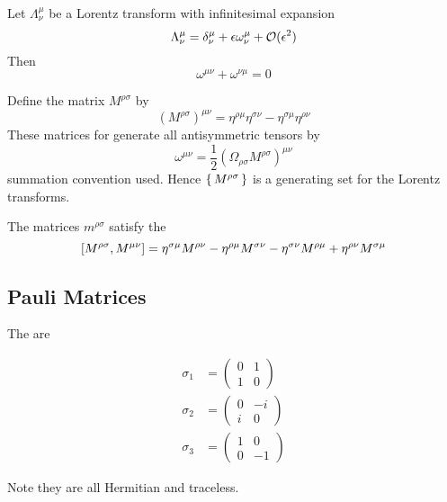 \documentclass{article}
\begin{document}
\begin{theorem}
Let $\Lambda^\mu_\nu$ be a Lorentz transform with infinitesimal expansion 
\[
\Lambda^\mu_\nu=\delta^\mu_\nu+\eps \omega^\mu_\nu +\mathcal{O}(\eps^2) 
\]
Then 
\[
\omega^{\mu\nu}+\omega^{\nu\mu}=0
\]
\end{theorem}

\begin{definition}
Define the matrix $M^{\rho\sigma}$ by 
\[
\left( M^{\rho\sigma} \right)^{\mu\nu} = \eta^{\rho\mu}\eta^{\sigma\nu}-\eta^{\sigma\mu}\eta^{\rho\nu}
\]
These matrices for generate all antisymmetric tensors by \[
\omega^{\mu\nu}=\frac{1}{2}\left(\Omega_{\rho\sigma}M^{\rho\sigma}\right)^{\mu\nu}
\]
summation convention used. Hence $\set{M^{\rho\sigma}}$ is a generating set for the Lorentz transforms. 
\end{definition}

\begin{definition}
The matrices $m^{\rho\sigma}$ satisfy the 
\[
\comm[M^{\rho\sigma}]{M^{\mu\nu}}=\eta^{\sigma\mu}M^{\rho\nu}-\eta^{\rho\mu}M^{\sigma\nu}-\eta^{\sigma\nu}M^{\rho\mu}+\eta^{\rho\nu}M^{\sigma\mu}
\]
\end{definition}

\subsection{Pauli Matrices}

\begin{definition}
The  are

\begin{align*}
\sigma_1 &= \begin{pmatrix} 0 & 1 \\ 1 & 0\end{pmatrix}  \\
\sigma_2 &= \begin{pmatrix} 0 & -i \\ i & 0\end{pmatrix}  \\
\sigma_3 &= \begin{pmatrix} 1 & 0 \\ 0 & -1\end{pmatrix}  
\end{align*}

Note they are all Hermitian and traceless.
\end{definition}
\end{document}
